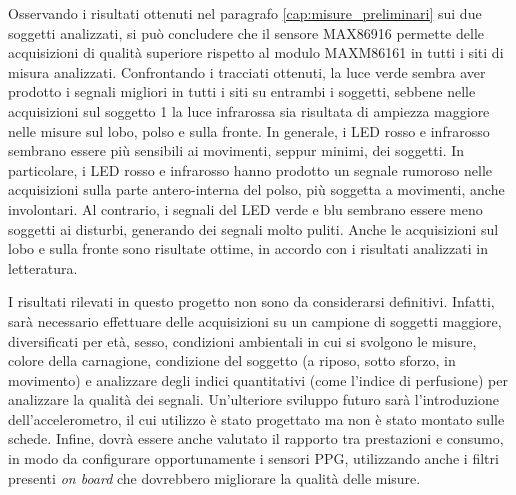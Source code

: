 \documentclass[
	a4paper,
	cleardoublepage=empty,
	headings=twolinechapter,
	numbers=autoenddot,
]{scrbook}
\begin{document}
	Osservando i risultati ottenuti nel paragrafo \ref{cap:misure_preliminari} sui due soggetti analizzati, si può concludere che il sensore MAX86916 permette delle acquisizioni di qualità superiore rispetto al modulo MAXM86161 in tutti i siti di misura analizzati. Confrontando i tracciati ottenuti, la luce verde sembra aver prodotto i segnali migliori in tutti i siti su entrambi i soggetti, sebbene nelle acquisizioni sul soggetto 1 la luce infrarossa sia risultata di ampiezza maggiore nelle misure sul lobo, polso e sulla fronte. In generale, i LED rosso e infrarosso sembrano essere più sensibili ai movimenti, seppur minimi, dei soggetti. In particolare, i LED rosso e infrarosso hanno prodotto un segnale rumoroso nelle acquisizioni sulla parte antero-interna del polso, più soggetta a movimenti, anche involontari. Al contrario, i segnali del LED verde e blu sembrano essere meno soggetti ai disturbi, generando dei segnali molto puliti. Anche le acquisizioni sul lobo e sulla fronte sono risultate ottime, in accordo con i risultati analizzati in letteratura.
	
	I risultati rilevati in questo progetto non sono da considerarsi definitivi. Infatti, sarà necessario effettuare delle acquisizioni su un campione di soggetti maggiore, diversificati per età, sesso, condizioni ambientali in cui si svolgono le misure, colore della carnagione, condizione del soggetto (a riposo, sotto sforzo, in movimento) e analizzare degli indici quantitativi (come l'indice di perfusione) per analizzare la qualità dei segnali. Un'ulteriore sviluppo futuro sarà l'introduzione dell'accelerometro, il cui utilizzo è stato progettato ma non è stato montato sulle schede. Infine, dovrà essere anche valutato il rapporto tra prestazioni e consumo, in modo da configurare opportunamente i sensori PPG, utilizzando anche i filtri presenti \textit{on board} che dovrebbero migliorare la qualità delle misure.
	

	
	
	
	
\end{document}
